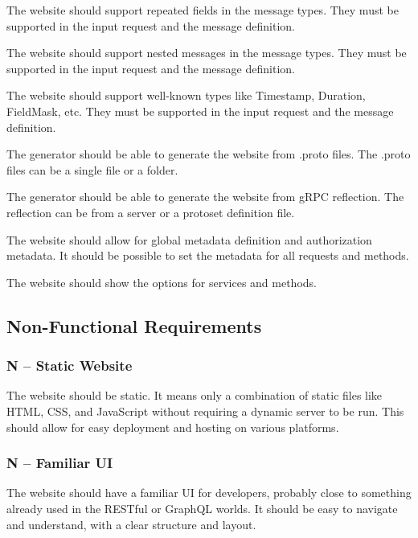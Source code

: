 The website should support repeated fields in the message types.
They must be supported in the input request and the message definition.

The website should support nested messages in the message types.
They must be supported in the input request and the message definition.

The website should support well-known types like Timestamp, Duration, FieldMask, etc.
They must be supported in the input request and the message definition.

The generator should be able to generate the website from .proto files.
The .proto files can be a single file or a folder.

The generator should be able to generate the website from gRPC reflection.
The reflection can be from a server or a protoset definition file.

The website should allow for global metadata definition and authorization metadata.
It should be possible to set the metadata for all requests and methods.

The website should show the options for services and methods.

\subsection{Non-Functional Requirements}
\newcommand{\nonfunctional}[1]{%
    \subsubsection{N -- #1}%
}

\nonfunctional{Static Website}
The website should be static.
It means only a combination of static files like HTML, CSS, and JavaScript without requiring a dynamic server to be run.
This should allow for easy deployment and hosting on various platforms.

\nonfunctional{Familiar UI}
The website should have a familiar UI for developers, probably close to something already used in the RESTful or GraphQL worlds.
It should be easy to navigate and understand, with a clear structure and layout.

